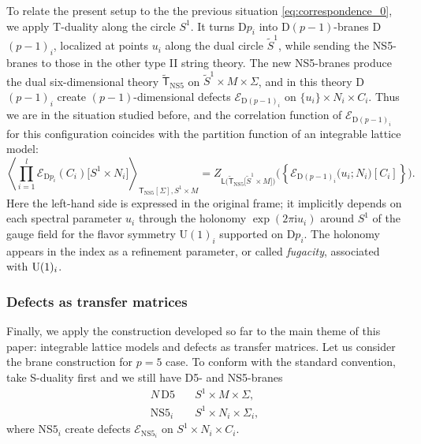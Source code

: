 To relate the present setup to the the previous situation \eqref{eq:correspondence_0},
we apply T-duality along the circle $S^{1}$. It turns D$p_{i}$
into D$(p-1)$-branes D$(p-1)_{i}$, localized
at points $u_{i}$ along the dual circle $\tilde{S}^{1}$, while sending
the NS5-branes to those in the other type II string theory. The new
NS5-branes produce the dual six-dimensional theory $\tilde{\mathsf{T}}_{\mathrm{NS5}}$
on $\tilde{S}^{1}\times M\times\Sigma$, and in this theory D$(p-1)_{i}$
create $(p-1)$-dimensional defects $\mathcal{E}_{\mathrm{D}(p-1)_{i}}$
on $\{ u_{i}\} \times N_{i}\times C_{i}$. Thus we are
in the situation studied before, and the correlation function of $\mathcal{E}_{\mathrm{D}(p-1)_{i}}$
for this configuration coincides with the partition function
of an integrable lattice model:
\begin{equation}
  \left\langle
    \prod_{i=1}^l \mathcal{E}_{\mathrm{D}p_i}(C_i) \big[S^1 \times N_i\big]
      \right\rangle_{\mathsf{T}_{\mathrm{NS5}}[\Sigma],S^{1}\times M}
    =
      Z_{\mathsf{L}\big(\tilde{\mathsf{T}}_{\mathrm{NS5}}\big[\tilde{S}^{1}\times M\big]\big)}
      \big( \left\{ \mathcal{E}_{\mathrm{D}(p-1)_i} \big(u_i; N_i\big) [C_i]\right\} \big).
\end{equation}
Here the left-hand side is expressed in the original frame; it implicitly
depends on each spectral parameter $u_{i}$ through the holonomy $\exp(2\pi\mathrm{i}u_{i})$
around $S^{1}$ of the gauge field for the flavor symmetry U$(1)_{i}$
supported on D$p_{i}$. The holonomy appears in the index as a refinement
parameter, or called \emph{fugacity}, associated with $\mathrm{U}(1)_i$.





\subsubsection{Defects as transfer matrices}

Finally, we apply the construction developed so far
to the main theme of this paper: integrable lattice models and defects
as transfer matrices. Let us consider the brane construction for $p=5$ case.
To conform with the standard convention, take
S-duality first and we still have D5- and NS5-branes
\begin{align*}
  N  \,  \mathrm{D5}   &  \quad S^{1}  \times  M  \times  \Sigma,  \\
  \mathrm{NS5}_{i}    &  \quad S^{1}  \times  N_{i}  \times  \Sigma_{i},
\end{align*}
where NS$5_{i}$ create defects $\mathcal{E}_{\mathrm{NS}5_{i}}$
on $S^{1}\times N_{i}\times C_{i}$.

